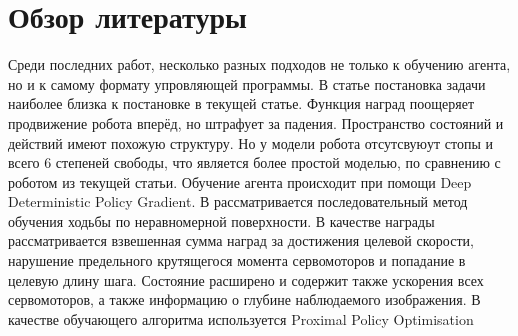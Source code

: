 \chapter{Обзор литературы}\label{ch:ch2}
Среди последних работ, несколько разных подходов не только к обучению агента, но и к самому формату упровляющей программы. В статье \cite{kumar2018bipedal}  постановка задачи наиболее близка к постановке в текущей статье. Функция наград поощеряет продвижение робота вперёд, но штрафует за падения. Пространство состояний и действий имеют похожую структуру. Но у модели робота отсутсвуюут стопы и всего 6 степеней свободы, что является более простой моделью, по сравнению с роботом из текущей статьи. Обучение агента происходит при помощи Deep Deterministic Policy Gradient. В \cite{tidd2021guided} рассматривается последовательный метод обучения ходьбы по неравномерной поверхности. В качестве награды рассматривается взвешенная сумма наград за достижения целевой скорости, нарушение предельного крутящегося момента сервомоторов и попадание в целевую длину шага. Состояние расширено и содержит также ускорения всех сервомоторов, а также информацию о глубине наблюдаемого изображения. В качестве обучающего алгоритма используется Proximal Policy Optimisation